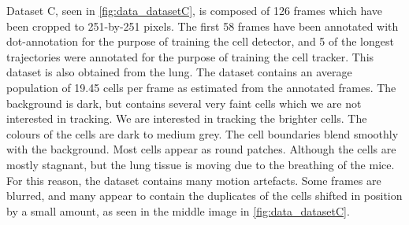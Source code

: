     Dataset C, seen in \cref{fig:data_datasetC}, is composed of 126 frames which have been cropped to 251-by-251 pixels. The first 58 frames have been annotated with dot-annotation for the purpose of training the cell detector, and 5 of the longest trajectories were annotated for the purpose of training the cell tracker. This dataset is also obtained from the lung. The dataset contains an average population of 19.45 cells per frame as estimated from the annotated frames. The background is dark, but contains several very faint cells which we are not interested in tracking. We are interested in tracking the brighter cells. The colours of the cells are dark to medium grey. The cell boundaries blend smoothly with the background. Most cells appear as round patches. Although the cells are mostly stagnant, but the lung tissue is moving due to the breathing of the mice. For this reason, the dataset contains many motion artefacts. Some frames are blurred, and many appear to contain the duplicates of the cells shifted in position by a small amount, as seen in the middle image in \cref{fig:data_datasetC}.

